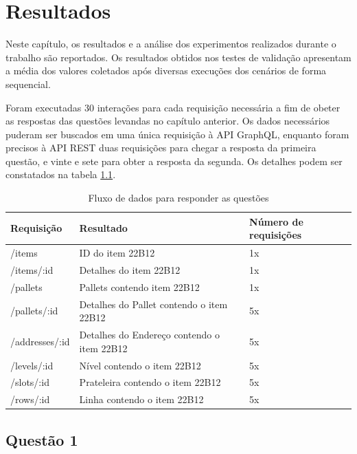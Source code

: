 \chapter{Resultados}

Neste capítulo, os resultados e a análise dos experimentos realizados durante o trabalho são reportados. Os resultados obtidos nos testes de validação apresentam a média dos valores coletados após diversas execuções dos cenários de forma sequencial.

Foram executadas 30 interações para cada requisição necessária a fim de obeter as respostas das questões levandas no capítulo anterior. Os dados necessários puderam ser buscados em uma única requisição à API GraphQL, enquanto foram precisos à API REST duas requisições para chegar a resposta da primeira questão, e vinte e sete para obter a resposta da segunda. Os detalhes podem ser constatados na tabela \ref{tab:request-table}.

\begin{table}[htbp]
    \centering
    \begin{tabular}{| l | l | l |}
        \hline
        \textbf{Requisição} & \textbf{Resultado} & \textbf{Número de requisições} \\ \hline
        /items & ID do item 22B12 & 1x \\ \hline
        /items/:id & Detalhes do item 22B12 & 1x \\ \hline
        /pallets & Pallets contendo item 22B12 & 1x \\ \hline
        /pallets/:id & Detalhes do Pallet contendo o item 22B12 & 5x \\ \hline
        /addresses/:id & Detalhes do Endereço contendo o item 22B12 & 5x \\ \hline
        /levels/:id & Nível contendo o item 22B12 & 5x \\ \hline
        /slots/:id & Prateleira contendo o item 22B12 & 5x  \\ \hline
        /rows/:id & Linha contendo o item 22B12 & 5x \\ \hline
    \end{tabular}
    \caption{Fluxo de dados para responder as questões} \label{tab:request-table}
\end{table}

\section{Questão 1}

